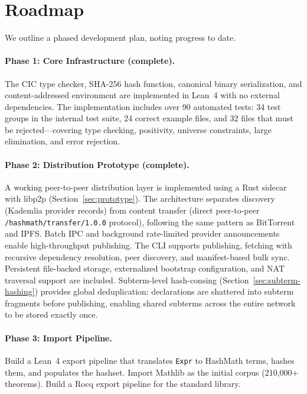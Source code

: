 \documentclass[11pt]{article}
\theoremstyle{definition}
\theoremstyle{plain}
\theoremstyle{remark}
\begin{document}
\section{Roadmap}
\label{sec:roadmap}

We outline a phased development plan, noting progress to date.

\paragraph{Phase 1: Core Infrastructure \textnormal{(complete)}.}
The CIC type checker, SHA-256 hash function, canonical binary serialization,
and content-addressed environment are implemented in Lean~4 with no external
dependencies.
The implementation includes over 90 automated tests: 34 test groups in the
internal test suite, 24 correct example files, and 32 files that must be
rejected---covering type checking, positivity, universe constraints, large
elimination, and error rejection.

\paragraph{Phase 2: Distribution Prototype \textnormal{(complete)}.}
A working peer-to-peer distribution layer is implemented using a Rust sidecar
with libp2p (Section~\ref{sec:prototype}).
The architecture separates discovery (Kademlia provider records) from content
transfer (direct peer-to-peer \texttt{/hashmath/transfer/1.0.0} protocol),
following the same pattern as BitTorrent and IPFS.
Batch IPC and background rate-limited provider announcements enable
high-throughput publishing.
The CLI supports publishing, fetching with recursive dependency resolution,
peer discovery, and manifest-based bulk sync.
Persistent file-backed storage, externalized bootstrap configuration, and
NAT traversal support are included.
Subterm-level hash-consing (Section~\ref{sec:subterm-hashing}) provides
global deduplication: declarations are shattered into subterm fragments
before publishing, enabling shared subterms across the entire network to be
stored exactly once.

\paragraph{Phase 3: Import Pipeline.}
Build a Lean~4 export pipeline that translates \texttt{Expr} to HashMath terms, hashes them,
and populates the hashset.
Import Mathlib as the initial corpus (210,000+ theorems).
Build a Rocq export pipeline for the standard library.
\end{document}
